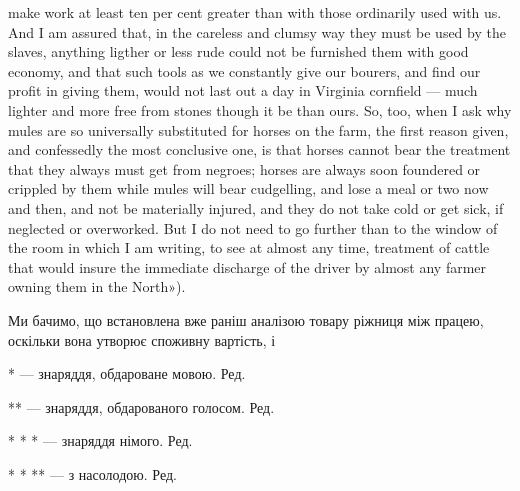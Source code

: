 {make work at least ten per cent greater than with those ordinarily used
with us. And I am assured that, in the careless and clumsy way they must
be used by the slaves, anything ligther or less rude could not be furnished
them with good economy, and that such tools as we constantly give our
bourers, and find our profit in giving them, would not last out a day in
Virginia cornfield — much lighter and more free from stones though it be
than ours. So, too, when I ask why mules are so universally substituted for
horses on the farm, the first reason given, and confessedly the most conclusive
one, is that horses cannot bear the treatment that they always must get
from negroes; horses are always soon foundered or crippled by them while
mules will bear cudgelling, and lose a meal or two now and then, and not
be materially injured, and they do not take cold or get sick, if neglected
or overworked. But I do not need to go further than to the window of the room
in which I am writing, to see at almost any time, treatment of cattle
that would insure the immediate discharge of the driver by almost any farmer
owning them in the North»).
}

Ми бачимо, що встановлена вже раніш аналізою товару ріжниця
між працею, оскільки вона утворює споживну вартість, і

* — знаряддя, обдароване мовою. Ред.

** — знаряддя, обдарованого голосом. Ред.

* * * — знаряддя німого. Ред.

* * ** — з насолодою. Ред.
\parbreak{}  %
